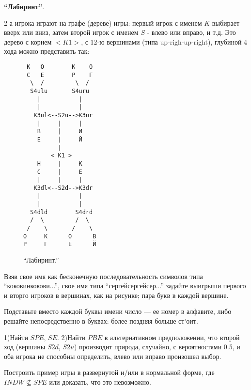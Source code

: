 \documentclass[a4paper,12pt]{article}
\begin{document}
\begin{exmp}
{\bf ``Лабиринт''}. {\rm 2-а игрока играют на графе
(дереве) игры: первый игрок с именем $K$ выбирает вверх или
вниз, затем второй игрок с именем $S$ - влево или вправо, и
т.д. Это дерево с корнем $<K1>$, с 12-ю вершинами (типа
up-righ-up-right), глубиной 4 хода можно представить так:

\begin{figure}[h]
\begin{verbatim}
 К   О        К    О
 С   Е        Р    Г
  \  /         \  /
  S4ulu       S4uru
    |           |
    |           |
   K3ul<--S2u-->K3ur
    |     |     |
    В     |     И
    Е     |     Й
          |
        < K1 >
    Н     |     К
    С     |     Е
    |     |     |
   K3dl<--S2d-->K3dr
    |           |
    |           |
  S4dld        S4drd
  /  \         /  \
 /    \       /    \
О     К      О      В
Р     Г      Е      Й
\end{verbatim}\caption{``Лабиринт.''}
\end{figure}

Взяв свое имя как бесконечную последовательность символов
типа ``коковинкокови...'', свое имя типа
``сергейсергейсер...'' задайте выигрыши первого и вторго
игроков в вершинах, как на рисунке; пара букв в каждой
вершине.

Подставьте вместо каждой буквы имени число --- ее номер в
алфавите, либо решайте непосредственно в буквах: более
поздняя больше ст'оит.

1)Найти $SPE$, $SE$. 2)Найти $PBE$ в альтернативном
предположении, что второй ход (вершины $S2d$, $S2u$)
производит природа, случайно, с вероятностями 0.5, и оба
игрока не способны определить, влево или вправо произошел
выбор. }\end{exmp} \vspace{2mm}



\begin{exmp}{\rm
Построить пример игры в развернутой и/или в нормальной
форме, где $INDW \not\subseteq SPE$ или доказать, что это
невозможно. }\end{exmp}
\end{document}
